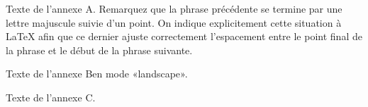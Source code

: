 Texte de l'annexe A\@. Remarquez que la phrase précédente se termine
par une lettre majuscule suivie d'un point. On indique explicitement
cette situation à \LaTeX{} afin que ce dernier ajuste correctement
l'espacement entre le point final de la phrase et le début de la
phrase suivante.


\begin{landscape}
Texte de l'annexe B\@ en mode «landscape».
\end{landscape}

Texte de l'annexe C\@.

